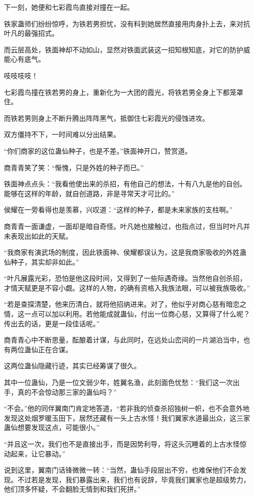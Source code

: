 \begin{this_body}
下一刻，她便和七彩霞鸟直接对撞在一起。

铁家蛊师们纷纷惊呼，为铁若男担忧，没有料到她居然直接用肉身扑上去，来对抗叶凡的最强招式。

而云层高处，铁面神却不动如山，显然对铁面武装这一招知根知底，对它的防护威能心有底气。

吱吱吱吱！

七彩霞鸟撞在铁若男的身上，重新化为一大团的霞光，将铁若男全身上下都笼罩住。

而铁若男则身上不断升腾出阵阵黑气，抵御住七彩霞光的侵蚀进攻。

双方僵持不下，一时间难以分出结果。

“你们商家的这位蛊仙种子，也是不差。”铁面神开口，赞赏道。

商青青笑了笑：“惭愧，只是外姓的种子而已。”

铁面神点点头：“我看他使出来的杀招，有他自己的想法，十有八九是他的自创。能够在这样的年龄，就自创道路，非是寻常天才可比的。”

侯耀在一旁看得也是羡慕，兴叹道：“这样的种子，都是未来家族的支柱啊。”

商青青一面谦虚，一面却是暗自奇怪。叶凡她也接触过，也指点过，但当时叶凡并未表现出如此的天赋。

“我商家有演武场的制度，因此铁面神、侯耀都误认为，这是我商家吸收的外姓蛊仙种子，其实却非如此。”

“叶凡展露光彩，恐怕是他这段时间，又得到了一些际遇奇缘。当然他自创杀招，才情天赋更是不容小觑。这样的人物，的确有资格入我族法眼，可以被我族吸收。”

“若是查探清楚，他来历清白，就将他招纳进来。对了，他似乎对商心慈有暗恋之情，这一点可以加以利用。若他能成就蛊仙，付出一位商心慈，又算得了什么呢？传出去的话，更是一段佳话呢。”

商青青心中不断思量，酝酿着计谋，与此同时，在远处山峦间的一片湖泊当中，也有两位蛊仙正在合谋。

这两位蛊仙隐藏行迹，其实已经筹谋了很久。

其中一位蛊仙，乃是一位文弱少年，姓翼名渔，此刻面色忧愁：“我们这一次出手，真的不会惊动那三家的蛊仙吗？”

“不会。”他的同伴翼南门肯定地答道，“若非我的侦查杀招独树一帜，也不会意外地发现这处烟罗暖玉田下，居然还藏有一头上古水怪！我们翼家水道最出众，这三家蛊仙想要发现这点，可能很小。”

“并且这一次，我们也不是直接出手，而是因势利导，将这头沉睡着的上古水怪惊动起来，让它暴动。”

说到这里，翼南门话锋微微一转：“当然，蛊仙手段层出不穷，也难保他们不会发现。不过若是发现，我们暴露出来，我们也有说辞，毕竟我们翼家也是超级势力，他们顶多怀疑，不会翻脸无情到和我们死拼。”


\end{this_body}
